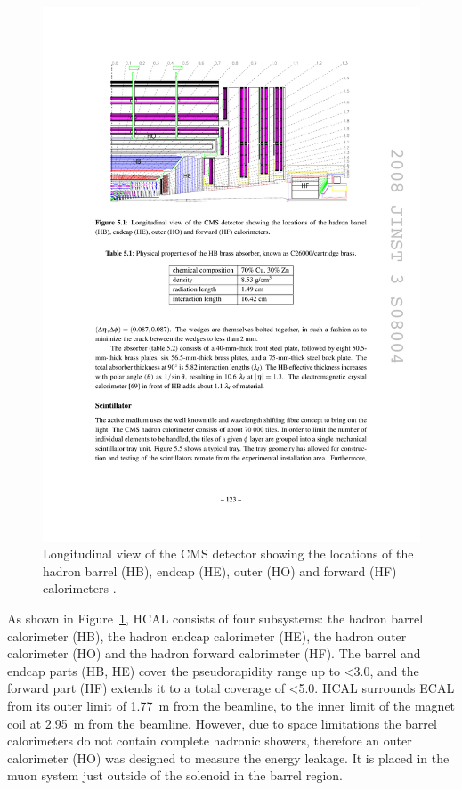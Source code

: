 \begin{figure}[htbp]
  \centering
  \leavevmode
  \includegraphics[width=\columnwidth]{HCAL}
  \caption{Longitudinal view of the CMS detector showing the locations of the hadron barrel (HB), endcap (HE), outer
  (HO) and forward (HF) calorimeters \autocite{CMS}.}
  \label{fig:HCAL}
\end{figure}

As shown in Figure~\ref{fig:HCAL}, HCAL consists of four subsystems: the hadron barrel calorimeter (HB), the hadron
endcap calorimeter (HE), the hadron outer calorimeter (HO) and the hadron forward calorimeter (HF). The barrel and
endcap parts (HB, HE) cover the pseudorapidity range up to \abs\eta \num{<3.0}, and the forward part (HF) extends it to
a total coverage of \abs\eta \num{<5.0}. HCAL surrounds ECAL from its outer limit of \SI{1.77}{\metre} from the
beamline, to the inner limit of the magnet coil at \SI{2.95}{\metre} from the beamline. However, due to space
limitations the barrel calorimeters do not contain complete hadronic showers, therefore an outer calorimeter (HO) was
designed to measure the energy leakage. It is placed in the muon system just outside of the solenoid in the barrel
region.

